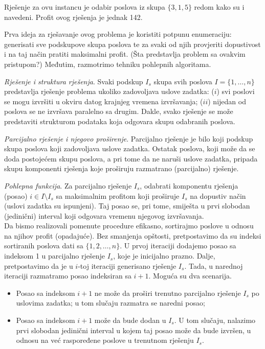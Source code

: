 Rješenje za ovu instancu je odabir poslova iz skupa $\{3, 1,5 \}$ redom kako su i navedeni. Profit ovog rješenja je jednak 142. 


Prva ideja za rješavanje ovog problema je koristiti potpunu enumera\-ciju: generisati sve podskupove
skupa poslova te za svaki od njih provjeriti dopusti\-vost i na taj način pratiti  
maksimalni profit. (Šta predstavlja problem sa ovakvim pristupom?) Međutim, razmotrimo  tehniku pohle\-pnih algoritama.   \\ \vspace{0.2cm}

\textit{Rješenje i struktura rješenja}. Svaki podskup $I_s$ skupa svih poslova $I=\{1,\ldots, n\}$ predstavlja rješenje  problema ukoliko zadovoljava uslove zadatka: ($i$) svi poslovi se mogu izvršiti u okviru datog krajnjeg vremena izvršavanja; ($ii$) nijedan od poslova se ne izvršava paralelno sa drugim. Dakle, svako rješenje se može predstaviti strukturom podataka koja odgovara skupu odabra\-nih poslova. 

\textit{Parcijalno rješenje i njegovo proširenje}.  Parcijalno rješenje je bilo koji podskup skupa poslova koji zadovoljava uslove zadatka. Ostatak poslova, koji može da se doda postojećem skupu poslova, a pri tome da ne naruši uslove zadatka, pripada skupu komponenti rješenja koje proširuju razmatrano (parcijalno) rješenje. 

\textit{Pohlepna funkcija}. Za parcijalno rješenje $I_s$, odabrati komponentu rješenja (posao) $i \in I\setminus I_s$ sa maksimalnim profitom koji proširuje $I_s$ na dopustiv način (uslovi zadatka su ispunjeni). Taj posao se, pri tome, smiješta u prvi slobodan (jedinični) interval koji odgovara vremenu njegovog izvršavanja. \\

Da bismo realizovali pomenute procedure efikasno, sortirajmo poslove u odnosu na njihov profit (opadajuće). Bez smanjenja opštosti, pretpo\-stavimo da su indeksi sortiranih poslova dati sa $\{1, 2, \ldots, n\}$. U prvoj iteraciji dodaje\-mo posao sa indeksom 1 u parcijalno rješenje $I_s$, koje je inicijalno prazno.  Dalje, pretpo\-stavimo da je u $i$-toj iteraciji generisano rješenje $I_s$. Tada, u narednoj iteraciji razmatramo posao indeksiran sa $i+1$. Moguća su dva scenarija.

\begin{itemize}
	\item Posao sa indeksom $i+1$ ne može da proširi trenutno parcijalno rješenje $I_s$ po uslovima zadatka; u tom slučaju razmatra se naredni posao;
	\item Posao sa indeksom $i+1$ može da bude dodan u $I_s$. U tom slučaju, nalazimo prvi slobodan jedinični interval u kojem taj posao može da bude izvršen, u odnosu na već raspoređene poslove u trenutnom rješenju $I_s$.  
\end{itemize} 

